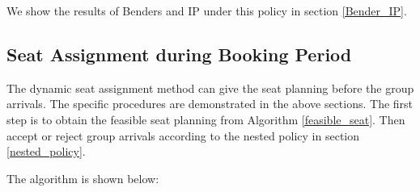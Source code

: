

We show the results of Benders and IP under this policy in section \ref{Bender_IP}.


\subsection{Seat Assignment during Booking Period}
The dynamic seat assignment method can give the seat planning before the group arrivals. The specific procedures are demonstrated in the above sections. The first step is to obtain the feasible seat planning from Algorithm \ref{feasible_seat}. Then accept or reject group arrivals according to the nested policy in section \ref{nested_policy}.

The algorithm is shown below:

